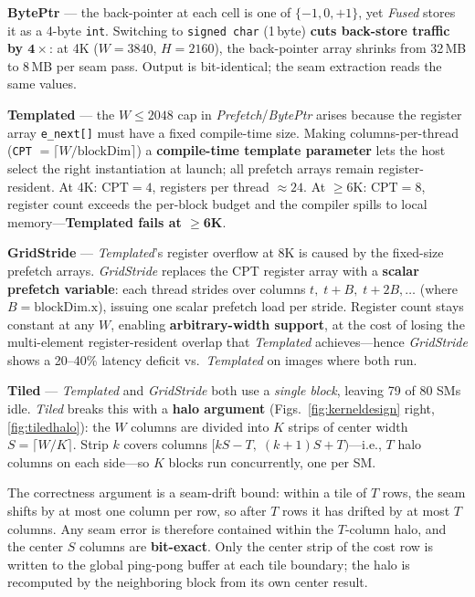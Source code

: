 \textbf{BytePtr} --- the back-pointer at each cell is one of $\{-1,0,+1\}$,
yet \emph{Fused} stores it as a 4-byte \texttt{int}.
Switching to \texttt{signed char} (1\,byte) \textbf{cuts back-store traffic by
$\bm{4\times}$}: at 4K ($W{=}3840$, $H{=}2160$), the back-pointer array
shrinks from 32\,MB to 8\,MB per seam pass.
Output is bit-identical; the seam extraction reads the same values.

\textbf{Templated} --- the $W\le 2048$ cap in \emph{Prefetch}/\emph{BytePtr}
arises because the register array \texttt{e\_next[]} must have a fixed
compile-time size.
Making columns-per-thread (\texttt{CPT} $= \lceil W/\text{blockDim}\rceil$) a
\textbf{compile-time template parameter} lets the host select the right
instantiation at launch; all prefetch arrays remain register-resident.
At 4K: $\text{CPT}=4$, registers per thread ${\approx}24$.
At ${\ge}6$K: $\text{CPT}=8$, register count exceeds the per-block budget
and the compiler spills to local memory---\textbf{Templated fails at $\ge$6K}.

\textbf{GridStride} --- \emph{Templated}'s register overflow at 8K is caused by
the fixed-size prefetch arrays.
\emph{GridStride} replaces the CPT register array with a \textbf{scalar
prefetch variable}: each thread strides over columns $t,\;t{+}B,\;t{+}2B,\ldots$
(where $B{=}\text{blockDim.x}$), issuing one scalar prefetch load per stride.
Register count stays constant at any $W$, enabling \textbf{arbitrary-width support},
at the cost of losing the multi-element register-resident overlap that
\emph{Templated} achieves---hence \emph{GridStride} shows a
20--40\% latency deficit vs.\ \emph{Templated} on images where both run.

\textbf{Tiled} --- \emph{Templated} and \emph{GridStride} both use a
\emph{single block}, leaving 79 of 80 SMs idle.
\emph{Tiled} breaks this with a \textbf{halo argument}
(Figs.~\ref{fig:kerneldesign} right, \ref{fig:tiledhalo}): the $W$ columns
are divided into $K$ strips of center width $S = \lceil W/K \rceil$.
Strip $k$ covers columns $[kS - T,\;(k{+}1)S + T)$---i.e., $T$ halo columns on
each side---so $K$ blocks run concurrently, one per SM.

The correctness argument is a seam-drift bound: within a tile of $T$ rows, the
seam shifts by at most one column per row, so after $T$ rows it has drifted by
at most $T$ columns.
Any seam error is therefore contained within the $T$-column halo, and the
center $S$ columns are \textbf{bit-exact}.
Only the center strip of the cost row is written to the global ping-pong
buffer at each tile boundary; the halo is recomputed by the neighboring block
from its own center result.

